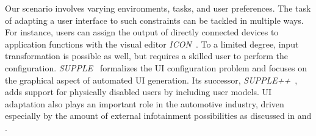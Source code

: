 \documentclass[twoside,twocolumn,10pt]{article}
\begin{document}
%
%
Our scenario involves varying environments, tasks, and user preferences. The task of adapting a user interface to such constraints can be tackled in multiple ways. For instance, users can assign the output of directly connected devices to application functions with the visual editor \emph{ICON}~\cite{ICON}. To a limited degree, input transformation is possible as well, but requires a skilled user to perform the configuration. \emph{SUPPLE}~\cite{Gajos:2004:SAG:964442.964461} formalizes the UI configuration problem and focuses on the graphical aspect of automated UI generation. Its successor, \emph{SUPPLE++}~\cite{Gajos:2007:AGU:1294211.1294253}, adds support for physically disabled users by including user models. UI adaptation also plays an important role in the automotive industry, driven especially by the amount of external infotainment possibilities as discussed in \cite{deMelo:2009:TFU:1620509.1620518} and \cite{Hauslschmid:2013:GTA:2516540.2516580}.


%
%
\end{document}
